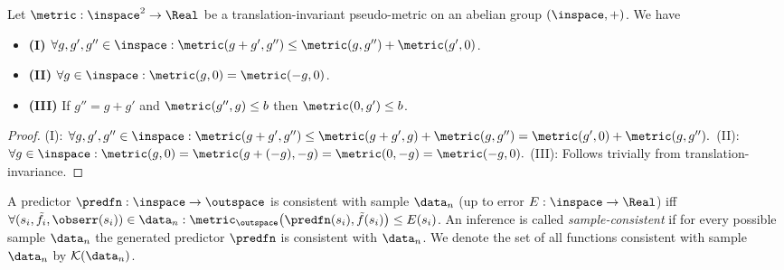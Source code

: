 \begin{lem} Let $\metric : \inspace^2 \to \Real$ be a translation-invariant pseudo-metric on an abelian group $(\inspace,+)$.
We have 
\begin{itemize}
\item \textbf{(I)} $\forall g,g',g'' \in \inspace: \metric(g+g',g'') \leq \metric(g,g'')+\metric(g',0)$.
\item \textbf{(II)} $\forall g \in \inspace: \metric(g,0) = \metric(-g,0)$.
\item \textbf{(III)} If $g'' = g+g'$ and $\metric(g'',g) \leq b$ then $\metric(0,g') \leq b$.
\end{itemize}
\begin{proof}
(I): $\forall g,g',g'' \in \inspace: \metric(g+g',g'') \leq \metric(g+g',g)+\metric(g,g'') = \metric(g',0)+\metric(g,g'').$
(II): $\forall g \in \inspace: \metric(g,0) = \metric(g+(-g),-g) = \metric(0,-g) =\metric(-g,0).$
(III): Follows trivially from translation-invariance.
\end{proof}
\label{lem:bilinaddtransinvgroup}
\end{lem}
 
\begin{defn}  A predictor $\predfn : \inspace \to \outspace$ is consistent with sample $\data_n$ (up to error $E: \inspace \to \Real$) iff $\forall (s_i,\tilde f_i,\obserr(s_i) ) \in \data_n: \metric_{\outspace}\bigl(\predfn(s_i),\tilde f(s_i)\bigr) \leq E(s_i) $. An inference is called \emph{sample-consistent} if for every possible sample $\data_n$ the generated predictor $\predfn$ is consistent with $\data_n$. We denote the set of all functions consistent with sample $\data_n$ by $\mathcal K (\data_n)$.
\label{def:sampleconsistency}
\end{defn}

